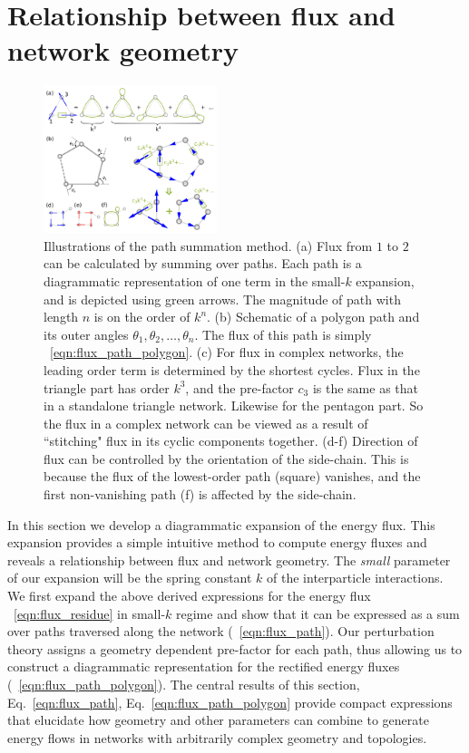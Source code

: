 \documentclass[
 preprint,
 preprintnumbers,
 amsmath,amssymb,
 aps,
 pre,
 longbibliography,
 superscriptaddress,
 10pt, twocolumn
]{revtex4-1}
\begin{document}
\section{Relationship between flux and network geometry} \label{sec:path}
\begin{figure}[ht]
	\centering
	\includegraphics[width=0.45\textwidth]{4_path_sum.pdf}
    \caption{Illustrations of the path summation method.
    (a) Flux from $1$ to $2$ can be calculated by summing over paths. Each path is a diagrammatic representation of one term in the small-$k$ expansion, and is depicted using green arrows. The magnitude of path with length $n$ is on the order of $k^n$.
    (b) Schematic of a polygon path and its outer angles $\theta_1,\theta_2,\dots,\theta_n$. The flux of this path is simply \eqnname~\eqref{eqn:flux_path_polygon}.
    (c) For flux in complex networks, the leading order term is determined by the shortest cycles. Flux in the triangle part has order $k^3$, and the pre-factor $c_3$ is the same as that in a standalone triangle network. Likewise for the pentagon part. So the flux in a complex network can be viewed as a result of ``stitching" flux in its cyclic components together.
    (d-f) Direction of flux can be controlled by the orientation of the side-chain. This is because the flux of the lowest-order path (square) vanishes, and the first non-vanishing path (f) is affected by the side-chain.
    }
    \label{fig:path_sum}
\end{figure}

In this section we develop a diagrammatic expansion of the energy flux. This expansion provides a simple intuitive method to compute energy fluxes and reveals a relationship between flux and network geometry. The {\it{small}} parameter of our expansion will be the spring constant $k$ of the interparticle interactions. We first expand the above derived expressions for the energy flux \eqnname~\eqref{eqn:flux_residue} in small-$k$ regime and show that it can be expressed as a sum over paths traversed along the network (\eqnname~\eqref{eqn:flux_path}). Our perturbation theory assigns a geometry dependent pre-factor for each path, thus allowing us to construct a diagrammatic representation for the rectified energy fluxes (\eqnname~\eqref{eqn:flux_path_polygon}). The central results of this section, Eq.~\ref{eqn:flux_path}, Eq.~\ref{eqn:flux_path_polygon} provide compact expressions that elucidate how geometry and other parameters can combine to generate energy flows in networks with arbitrarily complex geometry and topologies.
\end{document}
